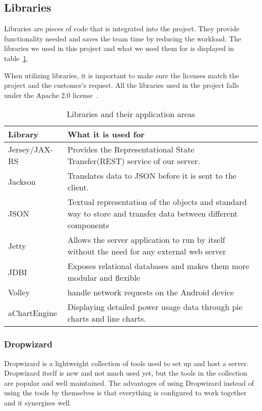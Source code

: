 \subsection{Libraries}
\label{sec:libraries}
Libraries are pieces of code that is integrated into the project. They provide functionality needed and saves the team time by reducing the workload. The libraries we used in this project and what we used them for is displayed in table~\ref{tab:libs}.

When utilizing libraries, it is important to make sure the licenses match the project and the customer's request. All the libraries used in the project falls under the Apache 2.0 license~\cite{Apache}.

\begin{table}[H]
\begin{tabular}{|l|p{12.9cm}|}
\hline
\textbf{Library }& \textbf{What it is used for}\\\hline
Jersey/JAX-RS & Provides the Representational State Transfer(REST) service of our server.\\\hline
Jackson&Translates data to JSON before it is sent to the client.\\\hline
JSON&Textual representation of the objects and standard way to store and transfer data between different components\\\hline
Jetty&Allows the server application to run by itself without the need for any external web server\\\hline
JDBI&Exposes relational databases and makes them more modular and flexible\\\hline
Volley & handle network requests on the Android device\\\hline
aChartEngine& Displaying detailed power usage data through  pie charts and line charts.\\\hline
\end{tabular}
\caption{Libraries and their application areas}
\label{tab:libs}
\end{table}

\subsubsection{Dropwizard}
Dropwizard is a lightweight collection of tools used to set up and host a server. Dropwizard itself is new and not much used yet, but the tools in the collection are popular and well maintained. 
The advantages of using Dropwizard instead of using the tools by themselves is that everything is configured to work together and it synergises well.



